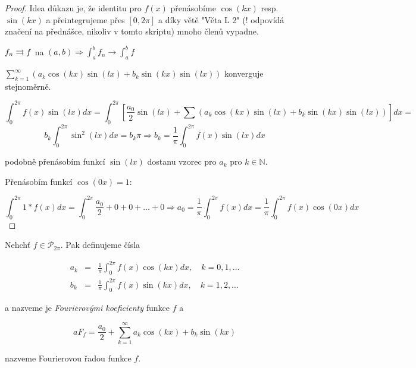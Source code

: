 \begin{proof}
Idea důkazu je, že identitu pro $f(x)$ přenásobíme $\cos(kx)$ resp. $\sin(kx)$  a přeintegrujeme přes $[0, 2 \pi]$ a díky větě "Věta L 2" (! odpovídá značení na přednášce, nikoliv v tomto skriptu) mnoho členů vypadne.

\begin{opakovani}
$f_n \rightrightarrows f$ na $(a,b) \Rightarrow \int_a^b f_n \rightarrow \int_a^b f$
\end{opakovani}

\begin{pozorovani}
$\sum_{k=1}^{\infty} \left( a_k \cos(kx) \sin(lx) + b_k \sin(kx) \sin(lx) \right)$ konverguje stejnoměrně.
\end{pozorovani}

$$\int_{0}^{2 \pi} f(x) \sin(lx) dx = \int_{0}^{2 \pi} \left[ \frac{a_0}{2} \sin(lx) + \sum \left( a_k \cos(kx) \sin(lx) + b_k \sin(kx) \sin(lx) \right) \right] dx = $$
$$b_k \int_{0}^{2 \pi} \sin^2(lx) dx = b_k \pi \Rightarrow b_k = \frac{1}{\pi} \int_0^{2 \pi} f(x) \sin(lx) dx$$

podobně přenásobím funkcí $\sin(lx)$ dostanu vzorec pro $a_k$ pro $k \in \mathbb{N}$.

Přenásobím funkcí $\cos(0x) = 1$:

$$\int_{0}^{2 \pi} 1 * f(x) dx = \int_{0}^{2 \pi} \frac{a_0}{2}+0+0+\ldots+0 \Rightarrow a_0 = \frac{1}{\pi} \int_{0}^{2 \pi} f(x) dx = \frac{1}{\pi} \int_0^{2 \pi} f(x) \cos(0x) dx$$

\end{proof}

\begin{definice}
Nehchť $f \in \mathcal{P}_{2 \pi}$. Pak definujeme čísla

\begin{eqnarray}
a_k & = & \frac{1}{\pi} \int_{0}^{2 \pi} f(x) \cos(kx) dx, \quad k=0,1,\ldots \nonumber\\
b_k & = & \frac{1}{\pi} \int_{0}^{2 \pi} f(x) \sin(kx) dx, \quad k=1,2,\ldots \nonumber
\end{eqnarray}

a nazveme je \emph{Fourierovými koeficienty} funkce $f$ a 

$$a F_f = \frac{a_0}{2} + \sum_{k=1}^\infty a_k \cos(kx) + b_k \sin(kx)$$

nazveme Fourierovou řadou funkce $f$.
\end{definice}

